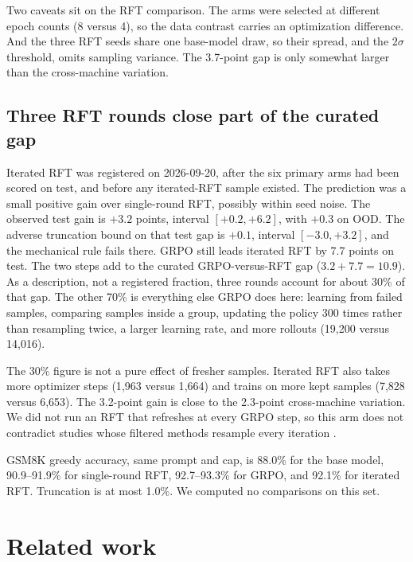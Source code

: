 Two caveats sit on the RFT comparison. The arms were selected at different epoch counts (8 versus 4), so the data contrast carries an optimization difference. And the three RFT seeds share one base-model draw, so their spread, and the $2\sigma$ threshold, omits sampling variance. The 3.7-point gap is only somewhat larger than the cross-machine variation.

\subsection{Three RFT rounds close part of the curated gap}
\label{sec:res-iter}

Iterated RFT was registered on 2026-09-20, after the six primary arms had been scored on test, and before any iterated-RFT sample existed. The prediction was a small positive gain over single-round RFT, possibly within seed noise. The observed test gain is $+3.2$ points, interval $[+0.2, +6.2]$, with $+0.3$ on OOD. The adverse truncation bound on that test gap is $+0.1$, interval $[-3.0, +3.2]$, and the mechanical rule fails there. GRPO still leads iterated RFT by 7.7 points on test. The two steps add to the curated GRPO-versus-RFT gap ($3.2 + 7.7 = 10.9$). As a description, not a registered fraction, three rounds account for about 30\% of that gap. The other 70\% is everything else GRPO does here: learning from failed samples, comparing samples inside a group, updating the policy 300 times rather than resampling twice, a larger learning rate, and more rollouts (19{,}200 versus 14{,}016).

The 30\% figure is not a pure effect of fresher samples. Iterated RFT also takes more optimizer steps (1{,}963 versus 1{,}664) and trains on more kept samples (7{,}828 versus 6{,}653). The 3.2-point gain is close to the 2.3-point cross-machine variation. We did not run an RFT that refreshes at every GRPO step, so this arm does not contradict studies whose filtered methods resample every iteration \citep{xiong2025minimalist,samineni2025rl}.

GSM8K greedy accuracy, same prompt and cap, is 88.0\% for the base model, 90.9--91.9\% for single-round RFT, 92.7--93.3\% for GRPO, and 92.1\% for iterated RFT. Truncation is at most 1.0\%. We computed no comparisons on this set.

\section{Related work}
\label{sec:related}

